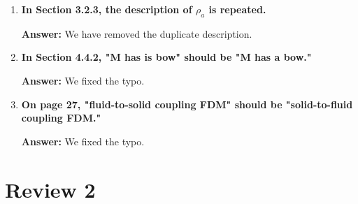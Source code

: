 \documentclass{article}
\newcommand{\answer}[1]{\textbf{\textcolor{answercolor}{Answer:}} \textcolor{answercolor}{#1}}
\begin{document}
\begin{enumerate}[label=\textbf{\arabic*.}]
    \answer{We changed "standard gravity" to "gravitational acceleration."}

    \item \textbf{In Section 3.2.3, the description of $\rho_a$ is repeated.}
    
    \answer{We have removed the duplicate description.}

    \item \textbf{In Section 4.4.2, "M has is bow" should be "M has a bow."}
    
    \answer{We fixed the typo.}

    \item \textbf{On page 27, "fluid-to-solid coupling FDM" should be "solid-to-fluid coupling FDM."}
    
    \answer{We fixed the typo.}
\end{enumerate}

\section*{Review 2}
\end{document}
